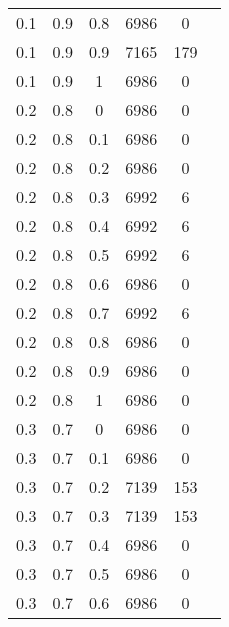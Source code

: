 \begin{table}
\begin{minipage}[h!]{0.10\hsize}
\begin{center}
{\begin{tabular}{|c@{\hspace{5mm}}|c@{\hspace{5mm}}|c@{\hspace{5mm}}|c@{\hspace{5mm}}|c@{\hspace{5mm}}|c|}
                    0.1  & 0.9  & 0.8  & 6986  & 0     \\
                    0.1  & 0.9  & 0.9  & 7165  & 179   \\
                    0.1  & 0.9  & 1    & 6986  & 0     \\
                    0.2  & 0.8  & 0    & 6986  & 0     \\
                    0.2  & 0.8  & 0.1  & 6986  & 0     \\
                    0.2  & 0.8  & 0.2  & 6986  & 0     \\
                    0.2  & 0.8  & 0.3  & 6992  & 6     \\
                    0.2  & 0.8  & 0.4  & 6992  & 6     \\
                    0.2  & 0.8  & 0.5  & 6992  & 6     \\
                    0.2  & 0.8  & 0.6  & 6986  & 0     \\
                    0.2  & 0.8  & 0.7  & 6992  & 6     \\
                    0.2  & 0.8  & 0.8  & 6986  & 0     \\
                    0.2  & 0.8  & 0.9  & 6986  & 0     \\
                    0.2  & 0.8  & 1    & 6986  & 0     \\
                    0.3  & 0.7  & 0    & 6986  & 0     \\
                    0.3  & 0.7  & 0.1  & 6986  & 0     \\
                    0.3  & 0.7  & 0.2  & 7139  & 153   \\
                    0.3  & 0.7  & 0.3  & 7139  & 153   \\
                    0.3  & 0.7  & 0.4  & 6986  & 0     \\
                    0.3  & 0.7  & 0.5  & 6986  & 0     \\
                    0.3  & 0.7  & 0.6  & 6986  & 0     \\
                \end{tabular}}
                \label{tab:log2}
        \end{center}
    \end{minipage}
    \hfill
    \begin{minipage}[!h]{0.50\hsize}\centering
        \begin{center}
\end{center}
\end{minipage}
\end{table}
